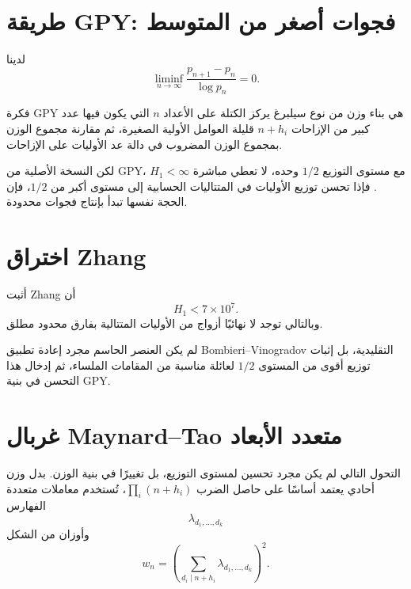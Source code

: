 \section{طريقة GPY: فجوات أصغر من المتوسط}

\begin{theorem}
\label{thm:chapter16-gpy}
لدينا
\[
 \liminf_{n\to\infty}
 \frac{p_{n+1}-p_n}{\log p_n}=0.
\]
\end{theorem}

فكرة GPY هي بناء وزن من نوع سيلبرغ يركز الكتلة على الأعداد \(n\) التي يكون فيها
عدد كبير من الإزاحات \(n+h_i\) قليلة العوامل الأولية الصغيرة، ثم مقارنة مجموع
الوزن بمجموع الوزن المضروب في دالة عد الأوليات على الإزاحات.

لكن النسخة الأصلية من GPY، مع مستوى التوزيع \(1/2\) وحده، لا تعطي مباشرة
\(H_1<\infty\). فإذا تحسن توزيع الأوليات في المتتاليات الحسابية إلى مستوى أكبر
من \(1/2\)، فإن الحجة نفسها تبدأ بإنتاج فجوات محدودة.

\section{اختراق Zhang}

\begin{theorem}[Zhang]
\label{thm:chapter16-zhang}
أثبت Zhang أن
\[
 H_1<7\times10^7.
\]
وبالتالي توجد لا نهائيًا أزواج من الأوليات المتتالية بفارق محدود مطلق.
\end{theorem}

لم يكن العنصر الحاسم مجرد إعادة تطبيق Bombieri--Vinogradov التقليدية، بل إثبات
توزيع أقوى من المستوى \(1/2\) لعائلة مناسبة من المقامات الملساء، ثم إدخال هذا
التحسن في بنية GPY.

\section{غربال Maynard--Tao متعدد الأبعاد}

التحول التالي لم يكن مجرد تحسين لمستوى التوزيع، بل تغييرًا في بنية الوزن. بدل
وزن أحادي يعتمد أساسًا على حاصل الضرب
\(\prod_i(n+h_i)\)، تُستخدم معاملات متعددة الفهارس
\[
 \lambda_{d_1,\dots,d_k}
\]
وأوزان من الشكل
\[
 w_n=
 \left(
 \sum_{d_i\mid n+h_i}
 \lambda_{d_1,\dots,d_k}
 \right)^2.
\]


